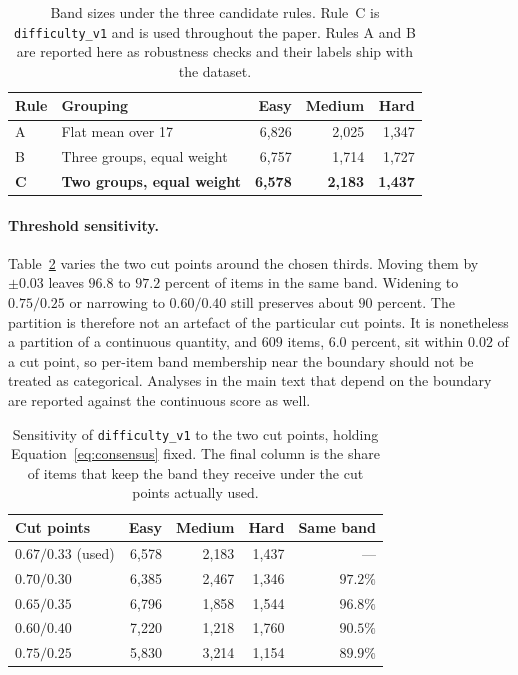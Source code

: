 \begin{table}[t]
\centering\small
\begin{tabular}{llrrr}
\toprule
\textbf{Rule} & \textbf{Grouping} & \textbf{Easy} & \textbf{Medium} & \textbf{Hard} \\
\midrule
A & Flat mean over 17          & 6{,}826 & 2{,}025 & 1{,}347 \\
B & Three groups, equal weight & 6{,}757 & 1{,}714 & 1{,}727 \\
\textbf{C} & \textbf{Two groups, equal weight} & \textbf{6{,}578} & \textbf{2{,}183} & \textbf{1{,}437} \\
\bottomrule
\end{tabular}
\caption{Band sizes under the three candidate rules. Rule~C is \texttt{difficulty\_v1} and is
used throughout the paper. Rules A and B are reported here as robustness checks and their labels
ship with the dataset.}
\label{tab:difficulty-rules}
\end{table}

\paragraph{Threshold sensitivity.}
Table~\ref{tab:difficulty-thresholds} varies the two cut points around the chosen thirds. Moving
them by $\pm 0.03$ leaves $96.8$ to $97.2$ percent of items in the same band. Widening to
$0.75/0.25$ or narrowing to $0.60/0.40$ still preserves about $90$ percent. The partition is
therefore not an artefact of the particular cut points. It is nonetheless a partition of a
continuous quantity, and $609$ items, $6.0$ percent, sit within $0.02$ of a cut point, so
per-item band membership near the boundary should not be treated as categorical. Analyses in the
main text that depend on the boundary are reported against the continuous score as well.

\begin{table}[t]
\centering\small
\begin{tabular}{lrrrr}
\toprule
\textbf{Cut points} & \textbf{Easy} & \textbf{Medium} & \textbf{Hard} & \textbf{Same band} \\
\midrule
$0.67/0.33$ (used) & 6{,}578 & 2{,}183 & 1{,}437 & --- \\
$0.70/0.30$        & 6{,}385 & 2{,}467 & 1{,}346 & $97.2\%$ \\
$0.65/0.35$        & 6{,}796 & 1{,}858 & 1{,}544 & $96.8\%$ \\
$0.60/0.40$        & 7{,}220 & 1{,}218 & 1{,}760 & $90.5\%$ \\
$0.75/0.25$        & 5{,}830 & 3{,}214 & 1{,}154 & $89.9\%$ \\
\bottomrule
\end{tabular}
\caption{Sensitivity of \texttt{difficulty\_v1} to the two cut points, holding
Equation~\ref{eq:consensus} fixed. The final column is the share of items that keep the band they
receive under the cut points actually used.}
\label{tab:difficulty-thresholds}
\end{table}

